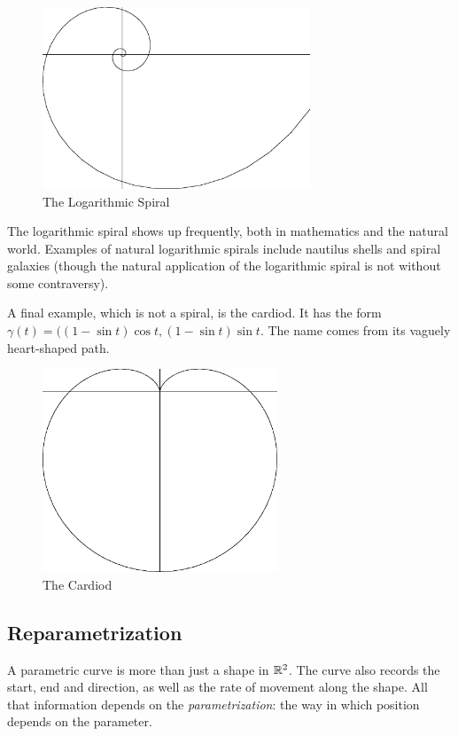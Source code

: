 \documentclass[fleqn]{report}
\begin{document}
\begin{figure}[ht]
\centering
\includegraphics[width=8cm]{figure15.eps}
\caption{The Logarithmic Spiral}
\label{figure-parametric-curve6}
\end{figure}

The logarithmic spiral shows up frequently, both in
mathematics and the natural world. Examples of natural
logarithmic spirals include nautilus shells and spiral
galaxies (though the natural application of the logarithmic
spiral is not without some contraversy).

\begin{example}
A final example, which is not a spiral, is the cardiod. It has
the form $\gamma(t) = ((1-\sin t) \cos t, (1-\sin t) \sin t$.
The name comes from its vaguely heart-shaped path.
\end{example}

\begin{figure}[ht]
\centering
\includegraphics[width=7cm]{figure16.eps}
\caption{The Cardiod}
\label{figure-parametric-curve7}
\end{figure}

\subsection{Reparametrization}
\label{reparametrization}

A parametric curve is more than just a shape in $\mathbb{R}^2$. The
curve also records the start, end and direction, as well as
the rate of movement along the shape. All that information
depends on the \emph{parametrization}: the way in which
position depends on the parameter.
\end{document}

